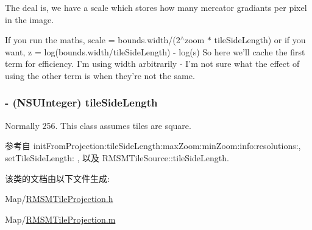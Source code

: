 The deal is, we have a scale which stores how many mercator gradiants per pixel in the image. 

If you run the maths, scale = bounds.\-width/(2$^\wedge$zoom $\ast$ tile\-Side\-Length) or if you want, z = log(bounds.\-width/tile\-Side\-Length) -\/ log(s) So here we'll cache the first term for efficiency. I'm using width arbitrarily -\/ I'm not sure what the effect of using the other term is when they're not the same. \hypertarget{interface_r_m_s_m_tile_projection_a879a1a2b92a2a00b75d55953df996ce3}{
\subsubsection[{tile\-Side\-Length}]{\setlength{\rightskip}{0pt plus 5cm}-\/ (N\-S\-U\-Integer) tile\-Side\-Length\hspace{0.3cm}{\ttfamily [protected]}}}\label{interface_r_m_s_m_tile_projection_a879a1a2b92a2a00b75d55953df996ce3}


Normally 256. This class assumes tiles are square. 



参考自 init\-From\-Projection\-:tile\-Side\-Length\-:max\-Zoom\-:min\-Zoom\-:info\-:resolutions\-:, set\-Tile\-Side\-Length\-: , 以及 R\-M\-S\-M\-Tile\-Source\-::tile\-Side\-Length.



该类的文档由以下文件生成\-:\begin{DoxyCompactItemize}
\item 
Map/\hyperlink{_r_m_s_m_tile_projection_8h}{R\-M\-S\-M\-Tile\-Projection.\-h}\item 
Map/\hyperlink{_r_m_s_m_tile_projection_8m}{R\-M\-S\-M\-Tile\-Projection.\-m}\end{DoxyCompactItemize}
